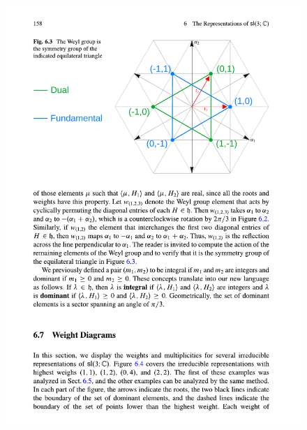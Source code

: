 \documentclass[../main.tex]{subfiles}
\begin{document}
\begin{figure}[h!]
	\includegraphics{images/hall_168_c2.pdf}
	\caption[]{}
\end{figure}
\end{document}
